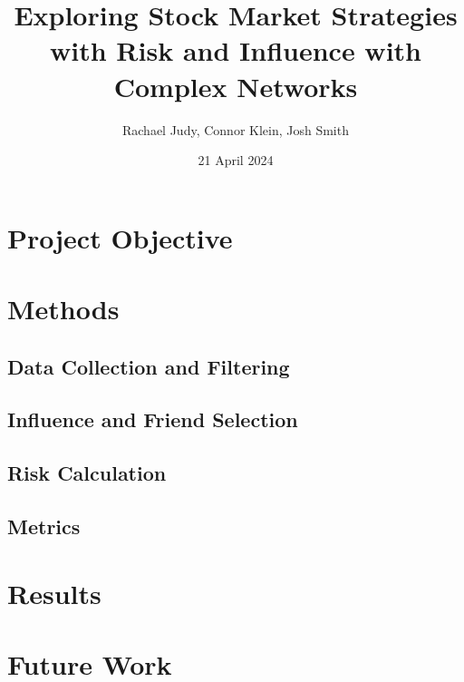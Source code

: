 \documentclass[11pt]{article}
\title{Exploring Stock Market Strategies with Risk and Influence with Complex Networks}
\author{Rachael Judy, Connor Klein, Josh Smith}
\date{21 April 2024}
\begin{document}
	\pgfplotsset{compat=1.18}
	
	\maketitle
	
	\section{Project Objective}\label{sec:objectives}
	
	
	\section{Methods}\label{sec:methods}
	
	
	\subsection{Data Collection and Filtering}\label{subsec:data}
	
	\subsection{Influence and Friend Selection}\label{subsec:friends}

	\subsection{Risk Calculation}\label{subsec:risk}
	
	\subsection{Metrics}\label{subsec:metrics}	



	\section{Results}\label{sec:results}
	
	
	
	\section{Future Work}\label{sec:futurework}
	
\end{document}
